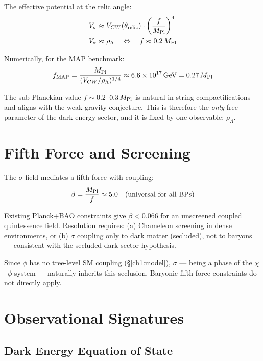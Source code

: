 The effective potential at the relic angle:
\begin{align}
  V_\sigma &\approx V_{CW}(\theta_{\rm relic}) \cdot \left(\frac{f}{M_{\rm Pl}}\right)^4 \\
  V_\sigma &\approx \rho_\Lambda \quad\Leftrightarrow\quad f \approx 0.2\,M_{\rm Pl}
\end{align}

Numerically, for the MAP benchmark:
\begin{equation}
  f_{\rm MAP} = \frac{M_{\rm Pl}}{(V_{CW}/\rho_\Lambda)^{1/4}}
              \approx 6.6\times10^{17}\,{\rm GeV} = 0.27\,M_{\rm Pl}
\end{equation}

The sub-Planckian value $f \sim 0.2$--$0.3\,M_{\rm Pl}$ is natural in string
compactifications and aligns with the weak gravity conjecture.
This is therefore the \emph{only} free parameter of the dark energy sector,
and it is fixed by one observable: $\rho_\Lambda$.

\section{Fifth Force and Screening}
\label{ch3:fifthforce}

The $\sigma$ field mediates a fifth force with coupling:
\begin{equation}
  \beta = \frac{M_{\rm Pl}}{f} \approx 5.0 \quad \text{(universal for all BPs)}
\end{equation}

Existing Planck+BAO constraints give $\beta < 0.066$ for an unscreened
coupled quintessence field. Resolution requires:
(a) Chameleon screening in dense environments, or
(b) $\sigma$ coupling only to dark matter (secluded),
    not to baryons — consistent with the secluded dark sector hypothesis.

Since $\phi$ has no tree-level SM coupling (§\ref{ch1:model}), $\sigma$ — being
a phase of the $\chi$–$\phi$ system — naturally inherits this seclusion.
Baryonic fifth-force constraints do not directly apply.

\section{Observational Signatures}
\label{ch3:signatures}

\subsection{Dark Energy Equation of State}

